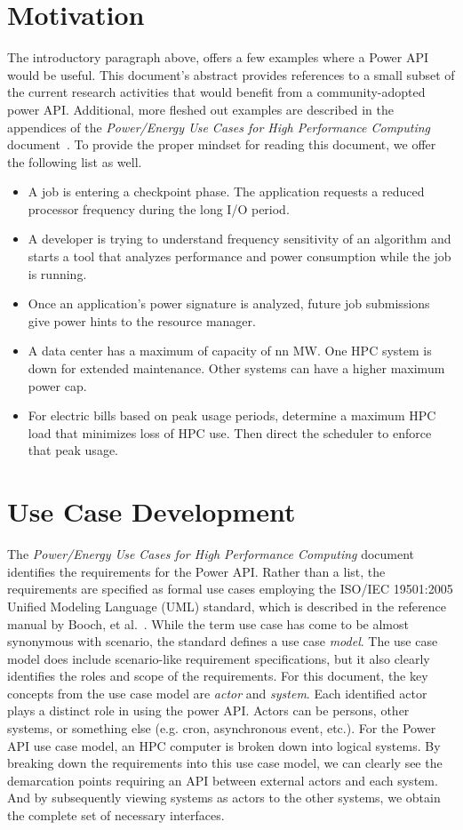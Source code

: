 \section{Motivation}\label{sec:Motivation}
The introductory paragraph above, offers a few examples where a Power API would be useful. 
This document's abstract provides references to a small subset of the current research activities that would benefit from a community-adopted power API.
Additional, more fleshed out examples are described in the appendices of the \emph{Power/Energy Use Cases for High Performance Computing} document~\cite{Laros:2013:PwrUseCase}.
To provide the proper mindset for reading this document, we offer the following list as well.
\begin{itemize}
\item A job is entering a checkpoint phase. The application requests a reduced processor frequency during the long I/O period.
\item A developer is trying to understand frequency sensitivity of an algorithm and starts a tool that analyzes performance and power consumption while the job is running.
\item Once an application's power signature is analyzed, future job submissions give power hints to the resource manager.
\item A data center has a maximum of capacity of nn MW. One HPC system is down for extended maintenance. Other systems can have a higher maximum power cap.
\item For electric bills based on peak usage periods, determine a maximum HPC load that minimizes loss of HPC use. Then direct the scheduler to enforce that peak usage.
\end{itemize}

\section{Use Case Development}\label{sec:UseCase}
The \emph{Power/Energy Use Cases for High Performance Computing} document~\cite{Laros:2013:PwrUseCase} identifies the requirements for the Power API.
Rather than a list, the requirements are specified as formal use cases employing the ISO/IEC 19501:2005 Unified Modeling Language (UML) standard, which is described in the reference manual by Booch, et al.~\cite{GangOfThree:1999}.
While the term use case has come to be almost synonymous with scenario, the standard defines a use case \emph{model}.
The use case model does include scenario-like requirement specifications, but it also clearly identifies the roles and scope of the requirements. 
For this document, the key concepts from the use case model are \emph{actor} and \emph{system}.
Each identified actor plays a distinct role in using the power API. 
Actors can be persons, other systems, or something else (e.g. cron, asynchronous event, etc.). 
For the Power API use case model, an HPC computer is broken down into logical systems.
By breaking down the requirements into this use case model, we can clearly see the demarcation points requiring an API between external actors and each system. 
And by subsequently viewing systems as actors to the other systems, we obtain the complete set of necessary interfaces.
 
